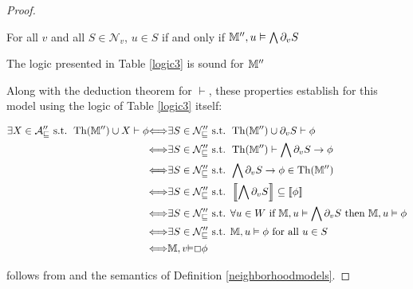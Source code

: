 \begin{proof}
\begin{enumerateroman}
    \item For all $v$ and all $S \in \mathcal{N}_v$, $u \in S$ if and only if
    $\mathbbm{M}'', u \vDash \bigwedge \partial_v S$
    
    \item The logic presented in Table \ref{logic3} is sound for
    $\mathbbm{M}''$
  \end{enumerateroman}
  Along with the deduction theorem for $\vdash$, these properties establish
   for this model using the logic of Table \ref{logic3} itself:
  
  \begin{align*}
    \text{$\exists X \in \mathcal{A''_v} \text{ s.t. } \tmop{Th}
    (\mathbbm{M}'') \cup X \vdash \phi$} & {\Longleftrightarrow}\text{$\exists
    S \in \mathcal{N''_v} \text{ s.t. } \tmop{Th} (\mathbbm{M}'') \cup
    \partial_v S \vdash \phi$}\\
    & {\Longleftrightarrow}\text{$\exists S \in \mathcal{N''_v} \text{ s.t. }
    \tmop{Th} (\mathbbm{M}'') \vdash \bigwedge \partial_v S \rightarrow
    \phi$}\\
    & {\Longleftrightarrow}\text{$\exists S \in \mathcal{N''_v} \text{ s.t. }
    \bigwedge \partial_v S \rightarrow \phi \in \tmop{Th} (\mathbbm{M}'')$}\\
    & {\Longleftrightarrow}\text{$\exists S \in \mathcal{N''_v} \text{ s.t. }
    \left\llbracket \bigwedge \partial_v S \right\rrbracket \subseteq
    \left\llbracket \phi \right\rrbracket$}\\
    & {\Longleftrightarrow}\text{$\exists S \in \mathcal{N''_v} \text{ s.t.
    $\forall u \in W$ if } \mathbbm{M}, u \vDash \bigwedge \partial_v S \text{
    then } \mathbbm{M}, u \vDash \phi$}\\
    & {\Longleftrightarrow}\text{$\exists S \in \mathcal{N''_v} \text{ s.t. }
    \mathbbm{M}, u \vDash \phi \text{ for all } u \in S$}\\
    & {\Longleftrightarrow}{\mathbbm{M}},v{\vDash}\Box{\phi}
  \end{align*}
  
   follows from  and the semantics of Definition
  \ref{neighborhoodmodels}.
\end{proof}
